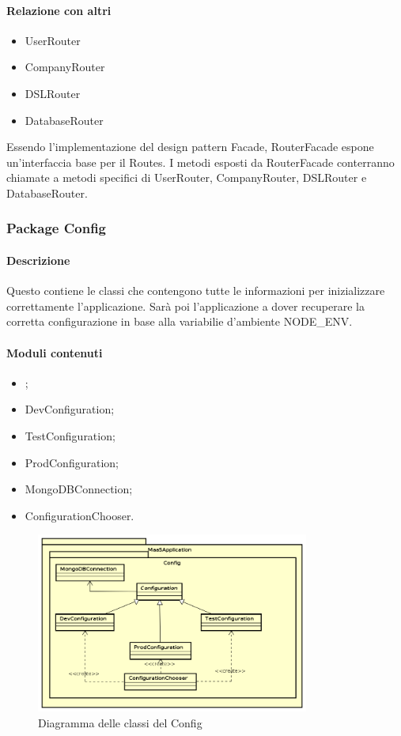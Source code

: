 \paragraph*{Relazione con altri }
\begin{itemize}
\item UserRouter
\item CompanyRouter
\item DSLRouter
\item DatabaseRouter
\end{itemize}
Essendo l'implementazione del design pattern Facade, RouterFacade espone un'interfaccia base per il  Routes. I metodi esposti da RouterFacade conterranno chiamate a metodi specifici di UserRouter, CompanyRouter, DSLRouter e DatabaseRouter.

\subsubsection{Package Config}
\paragraph*{Descrizione}
Questo  contiene le classi  che contengono tutte le informazioni per inizializzare correttamente l'applicazione. 
Sarà poi l'applicazione a dover recuperare la corretta configurazione in base alla variabilie d'ambiente NODE\_ENV.

\paragraph*{Moduli contenuti}
\begin{itemize}
\item {};
\item DevConfiguration;
\item TestConfiguration;
\item ProdConfiguration;
\item MongoDBConnection;
\item ConfigurationChooser.
\end{itemize}

\begin{figure}[H]
\centering
\includegraphics[width=0.8\textwidth]{res/sections/backend/config.png}
\caption{Diagramma delle classi del  Config}
\end{figure}

